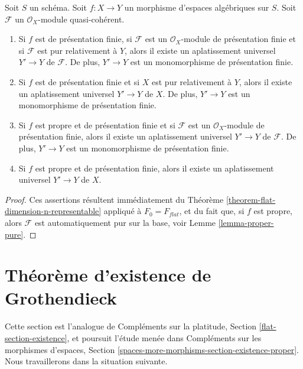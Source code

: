 \begin{lemma}
\label{lemma-when-universal-flattening}
Soit $S$ un schéma.
Soit $f : X \to Y$ un morphisme d'espaces algébriques sur $S$.
Soit $\mathcal{F}$ un $\mathcal{O}_X$-module quasi-cohérent.
\begin{enumerate}
\item Si $f$ est de présentation finie, si $\mathcal{F}$ est un
$\mathcal{O}_X$-module de présentation finie et si $\mathcal{F}$ est
pur relativement à $Y$, alors il existe un aplatissement universel
$Y' \to Y$ de $\mathcal{F}$. De plus, $Y' \to Y$ est un monomorphisme
de présentation finie.
\item Si $f$ est de présentation finie et si $X$ est pur relativement à $Y$,
alors il existe un aplatissement universel $Y' \to Y$ de $X$.
De plus, $Y' \to Y$ est un monomorphisme de présentation finie.
\item Si $f$ est propre et de présentation finie et si $\mathcal{F}$ est un
$\mathcal{O}_X$-module de présentation finie, alors il existe un
aplatissement universel $Y' \to Y$ de $\mathcal{F}$. De plus, $Y' \to Y$ est
un monomorphisme de présentation finie.
\item Si $f$ est propre et de présentation finie,
alors il existe un aplatissement universel $Y' \to Y$ de $X$.
\end{enumerate}
\end{lemma}

\begin{proof}
Ces assertions résultent immédiatement du
Théorème \ref{theorem-flat-dimension-n-representable}
appliqué à $F_0 = F_{flat}$,
et du fait que, si $f$ est propre, alors $\mathcal{F}$ est automatiquement
pur sur la base, voir
Lemme \ref{lemma-proper-pure}.
\end{proof}






\section{Théorème d'existence de Grothendieck}
\label{section-existence}

\noindent
Cette section est l'analogue de
Compléments sur la platitude, Section \ref{flat-section-existence},
et poursuit l'étude menée dans
Compléments sur les morphismes d'espaces, Section
\ref{spaces-more-morphisms-section-existence-proper}.
Nous travaillerons dans la situation suivante.

